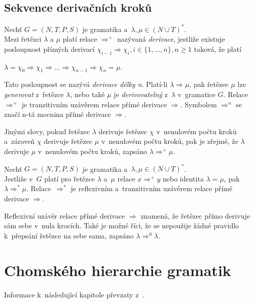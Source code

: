 \subsection*{Sekvence derivačních kroků}\label{kap_sekvence_der_kroku}
\begin{definition}\label{def_der_krok_tranz}
    Nechť $G = (N, T, P, S)$ je gramatika a~$\lambda, \mu \in (N \cup T)^*$. \\
    Mezi řetězci $\lambda$ a $\mu$ platí relace $\Rightarrow^+$ nazývaná \emph{derivace}, jestliže existuje posloupnost přímých derivací $\chi_{i-1} \Rightarrow \chi_i, i \in \{1, \ldots, n\}, n \geq 1$ taková, že platí
    \begin{center}
        $\lambda = \chi_0 \Rightarrow \chi_1 \Rightarrow \ldots \Rightarrow \chi_{n-1} \Rightarrow \chi_n = \mu$.
    \end{center}
    Tato posloupnost se nazývá \emph{derivace délky n}.
    Platí-li $\lambda \Rightarrow \mu$, pak řetězec $\mu$ lze \emph{generovat} z~řetězce $\lambda$, nebo také $\mu$ je \emph{derivovatelný} z~$\lambda$ v~gramatice $G$.
    Relace $\Rightarrow^+$ je tranzitivním uzávěrem relace přímé derivace $\Rightarrow$.
    Symbolem $\Rightarrow^n$ se značí n-tá mocnina přímé derivace $\Rightarrow$.
\end{definition}
Jinými slovy, pokud řetězec $\lambda$ derivuje řetězec $\chi$ v~nenulovém počtu kroků a~zároveň $\chi$ derivuje řetězec $\mu$ v~nenulovém počtu kroků, pak je zřejmé, že $\lambda$ derivuje $\mu$ v~nenulovém počtu kroků, zapsáno $\lambda \Rightarrow^+ \mu$. 

\begin{definition}\label{def_der_krok_refl_tranz}
    Nechť $G = (N, T, P, S)$ je gramatika a~$\lambda, \mu \in (N \cup T)^*$. \\
    Jestliže v~$G$ platí pro řetězce $\lambda$ a~$\mu$ relace $x \Rightarrow^+ y$ nebo identita $\lambda = \mu$, pak $\lambda \Rightarrow^* \mu$.
    Relace~$\Rightarrow^*$ je reflexivním a~tranzitivním uzávěrem relace přímé derivace $\Rightarrow$.  
\end{definition}
Reflexivní uzávěr relace přímé derivace $\Rightarrow$ znamená, že řetězec přímo derivuje sám sebe v~nula krocích.
Také je možné říci, že se nepoužije žádné pravidlo k~přepsání řetězce na sebe sama, zapsáno $\lambda \Rightarrow^0 \lambda$.

\section{Chomského hierarchie gramatik}\label{kap_chomsky_hierarchie}
Informace k~následující kapitole převzaty z~\cite{TIN-opora}.


